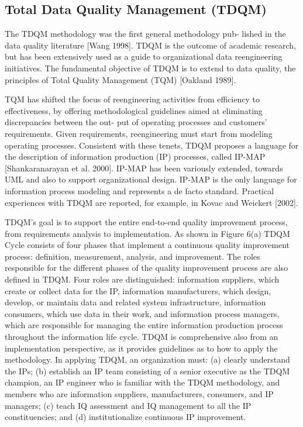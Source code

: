 \documentclass[pdftex,english,oribibl]{llncs}
\begin{document}
    \subsection{Total Data Quality Management (TDQM)}

    The TDQM methodology was the first general methodology pub- lished in the data quality literature [Wang 1998]. TDQM is the outcome of academic research, but has been extensively used as a guide to organizational data reengineering initiatives. The fundamental objective of TDQM is to extend to data quality, the principles of Total Quality Management (TQM) [Oakland 1989].

    TQM has shifted the focus of reengineering activities from efficiency to effectiveness, by offering methodological guidelines aimed at eliminating discrepancies between the out- put of operating processes and customers’ requirements. Given requirements, reengineering must start from modeling operating processes. Consistent with these tenets, TDQM proposes a language for the description of information production (IP) processes, called IP-MAP [Shankaranarayan et al. 2000]. IP-MAP has been variously extended, towards UML and also to support organizational design. IP-MAP is the only language for information process modeling and represents a de facto standard. Practical experiences with TDQM are reported, for example, in Kovac and Weickert [2002].

    TDQM’s goal is to support the entire end-to-end quality improvement process, from requirements analysis to implementation.
    As shown in Figure 6(a) TDQM Cycle consists of four phases that implement a continuous quality improvement process: definition, measurement, analysis, and improvement.
    The roles responsible for the different phases of the quality improvement process are also defined in TDQM.
    Four roles are distinguished: information suppliers, which create or collect data for the IP, information manufacturers, which design, develop, or maintain data and related system infrastructure, information consumers, which use data in their work, and information process managers, which are responsible for managing the entire information production process throughout the information life cycle.
    TDQM is comprehensive also from an implementation perspective, as it provides guidelines as to how to apply the methodology.
    In applying TDQM, an organization must:
    (a) clearly understand the IPs;
    (b) establish an IP team consisting of a senior executive as the TDQM champion, an IP engineer who is familiar with the TDQM methodology, and members who are information suppliers, manufacturers, consumers, and IP managers;
    (c) teach IQ assessment and IQ management to all the IP constituencies; and
    (d) institutionalize continuous IP improvement.
\end{document}
